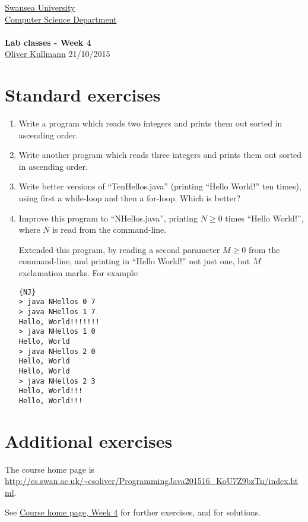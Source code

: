 \documentclass[11pt]{article}
\newcommand{\Java}{\lstset{language=Java,keywordstyle=\bfseries,breaklines,breakindent=30pt}}
\begin{document}
\begin{center}
  \href{http://www.swan.ac.uk/}{Swansea University}\\
  \href{http://www.swan.ac.uk/compsci/}{Computer Science Department}\\[1ex]
  \href{\chp}{\module}\\[1ex]
  \textbf{Lab classes - Week 4}\\
  \href{http://cs.swan.ac.uk/~csoliver}{Oliver Kullmann} 21/10/2015
\end{center}


\section{Standard exercises}
\label{sec:stdex}

\Java

\begin{enumerate}
\item Write a program which reads two integers and prints them out sorted in ascending order.
\item Write another program which reads three integers and prints them out sorted in ascending order.
\item Write better versions of ``TenHellos.java'' (printing ``Hello World!'' ten times), using first a while-loop and then a for-loop. Which is better?
\item Improve this program to ``NHellos.java'', printing $N \ge 0$ times ``Hello World!'', where $N$ is read from the command-line.

  Extended this program, by reading a second parameter $M \ge 0$ from the command-line, and printing in ``Hello World!'' not just one, but $M$ exclamation marks. For example:
  \begin{lstlisting}{NJ}
> java NHellos 0 7
> java NHellos 1 7
Hello, World!!!!!!!
> java NHellos 1 0
Hello, World
> java NHellos 2 0
Hello, World
Hello, World
> java NHellos 2 3
Hello, World!!!
Hello, World!!!
  \end{lstlisting}

\end{enumerate}


\section{Additional exercises}
\label{sec:addex}

The course home page is \url{http://cs.swan.ac.uk/~csoliver/ProgrammingJava201516_KoU7Z9bzTn/index.html}.

See \href{\chp#ExercisesWeek04}{Course home page, Week 4} for further exercises, and for solutions.
\end{document}
